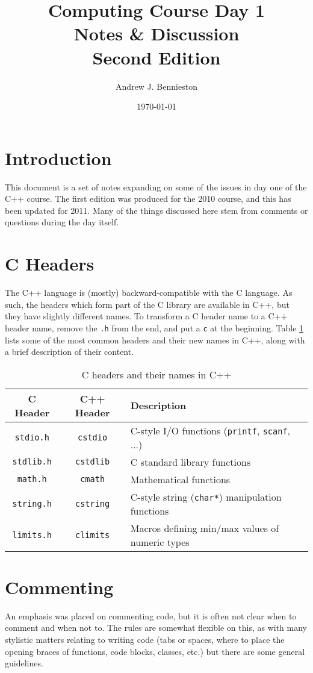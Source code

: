 \documentclass[a4paper]{scrartcl}
\title{Computing Course Day 1\\
Notes \& Discussion\\
Second Edition}
\author{Andrew J. Bennieston}
\date{\today}
\begin{document}
\maketitle

\tableofcontents

\pagebreak

\section{Introduction}
This document is a set of notes expanding on some of the issues in day one of the C++ course. The first edition was produced for the 2010 course, and this has been updated for 2011. Many of the things discussed here stem from comments or questions during the day itself.

\section{C Headers}
The C++ language is (mostly) backward-compatible with the C language. As such, the headers which form part of the C library are available in C++, but they have slightly different names. To transform a C header name to a C++ header name, remove the \texttt{.h} from the end, and put a \texttt{c} at the beginning. Table \ref{c-cpp-headers} lists some of the most common headers and their new names in C++, along with a brief description of their content.

\begin{table}[h]
\centering
\begin{tabular}{|c|c|l|}
\hline
C Header & C++ Header & Description \\
\hline
\texttt{stdio.h} & \texttt{cstdio} & C-style I/O functions (\texttt{printf}, \texttt{scanf}, ...) \\
\texttt{stdlib.h} & \texttt{cstdlib} & C standard library functions \\
\texttt{math.h} & \texttt{cmath} & Mathematical functions \\
\texttt{string.h} & \texttt{cstring} & C-style string (\texttt{char*}) manipulation functions \\
\texttt{limits.h} & \texttt{climits} & Macros defining min/max values of numeric types \\
\hline
\end{tabular}
\caption{\label{c-cpp-headers}C headers and their names in C++}
\end{table}

\section{Commenting}
An emphasis was placed on commenting code, but it is often not clear when to comment and when not to. The rules are somewhat flexible on this, as with many stylistic matters relating to writing code (tabs or spaces, where to place the opening braces of functions, code blocks, classes, etc.) but there are some general guidelines.
\end{document}
